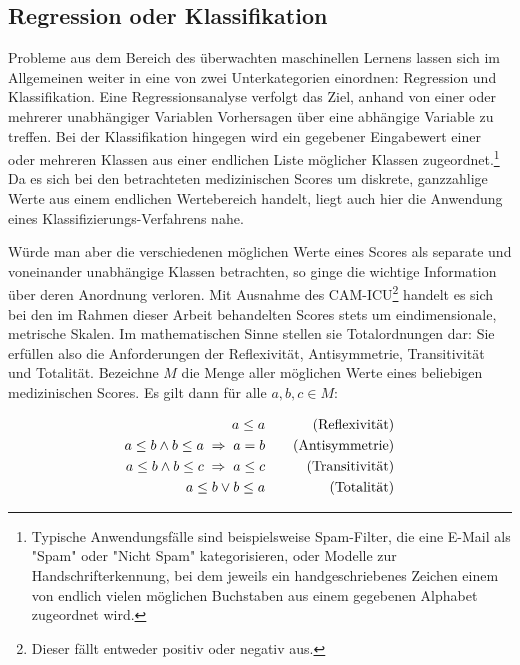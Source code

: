 \subsection{Regression oder Klassifikation}\label{section:regrvsclf}
Probleme aus dem Bereich des überwachten maschinellen Lernens lassen sich im Allgemeinen weiter in eine von zwei Unterkategorien einordnen: Regression und Klassifikation. Eine Regressionsanalyse verfolgt das Ziel, anhand von einer oder mehrerer unabhängiger Variablen Vorhersagen über eine abhängige Variable zu treffen. Bei der Klassifikation hingegen wird ein gegebener Eingabewert einer oder mehreren Klassen aus einer endlichen Liste möglicher Klassen zugeordnet.\footnote{Typische Anwendungsfälle sind beispielsweise Spam-Filter, die eine E-Mail als "Spam" oder "Nicht Spam" kategorisieren, oder Modelle zur Handschrifterkennung, bei dem jeweils ein handgeschriebenes Zeichen einem von endlich vielen möglichen Buchstaben aus einem gegebenen Alphabet zugeordnet wird.}
Da es sich bei den betrachteten medizinischen Scores um diskrete, ganzzahlige Werte aus einem endlichen Wertebereich handelt, liegt auch hier die Anwendung eines Klassifizierungs-Verfahrens nahe.

Würde man aber die verschiedenen möglichen Werte eines Scores als separate und voneinander unabhängige Klassen betrachten, so ginge die wichtige Information über deren Anordnung verloren. Mit Ausnahme des CAM-ICU\footnote{Dieser fällt entweder positiv oder negativ aus.} handelt es sich bei den im Rahmen dieser Arbeit behandelten Scores stets um eindimensionale, metrische Skalen. Im mathematischen Sinne stellen sie Totalordnungen dar: Sie erfüllen also die Anforderungen der Reflexivität, Antisymmetrie, Transitivität und Totalität. Bezeichne $M$ die Menge aller möglichen Werte eines beliebigen medizinischen Scores. Es gilt dann für alle $a,b,c \in M$:

\begin{equation*}
    \centering
    \begin{aligned}[c]
        a \leq a\\
        a \leq b \land b \leq a \; \Rightarrow \; a=b\\
        a \leq b \land b \leq c \; \Rightarrow \; a \leq c\\
        a \leq b \lor b \leq a
    \end{aligned}
    \qquad
    \begin{aligned}[c]
        \text{(Reflexivität)}\\
        \text{(Antisymmetrie)}\\
        \text{(Transitivität)}\\
        \text{(Totalität)}
    \end{aligned}
\end{equation*}

